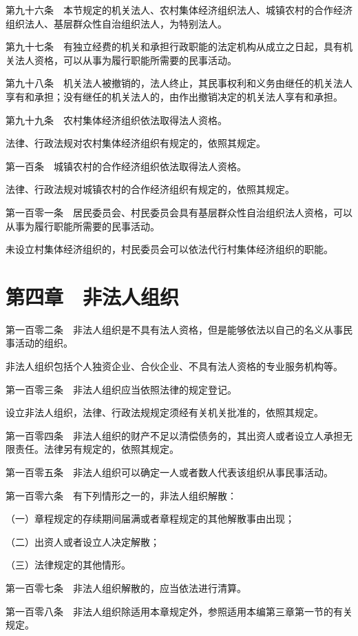 \documentclass[UTF8,12pt,a4paper]{ctexbook}
\begin{document}
第九十六条　本节规定的机关法人、农村集体经济组织法人、城镇农村的合作经济组织法人、基层群众性自治组织法人，为特别法人。

第九十七条　有独立经费的机关和承担行政职能的法定机构从成立之日起，具有机关法人资格，可以从事为履行职能所需要的民事活动。

第九十八条　机关法人被撤销的，法人终止，其民事权利和义务由继任的机关法人享有和承担；没有继任的机关法人的，由作出撤销决定的机关法人享有和承担。

第九十九条　农村集体经济组织依法取得法人资格。

法律、行政法规对农村集体经济组织有规定的，依照其规定。

第一百条　城镇农村的合作经济组织依法取得法人资格。

法律、行政法规对城镇农村的合作经济组织有规定的，依照其规定。

第一百零一条　居民委员会、村民委员会具有基层群众性自治组织法人资格，可以从事为履行职能所需要的民事活动。

未设立村集体经济组织的，村民委员会可以依法代行村集体经济组织的职能。

\section*{第四章　非法人组织}

第一百零二条　非法人组织是不具有法人资格，但是能够依法以自己的名义从事民事活动的组织。

非法人组织包括个人独资企业、合伙企业、不具有法人资格的专业服务机构等。

第一百零三条　非法人组织应当依照法律的规定登记。

设立非法人组织，法律、行政法规规定须经有关机关批准的，依照其规定。

第一百零四条　非法人组织的财产不足以清偿债务的，其出资人或者设立人承担无限责任。法律另有规定的，依照其规定。

第一百零五条　非法人组织可以确定一人或者数人代表该组织从事民事活动。

第一百零六条　有下列情形之一的，非法人组织解散：

（一）章程规定的存续期间届满或者章程规定的其他解散事由出现；

（二）出资人或者设立人决定解散；

（三）法律规定的其他情形。

第一百零七条　非法人组织解散的，应当依法进行清算。

第一百零八条　非法人组织除适用本章规定外，参照适用本编第三章第一节的有关规定。
\end{document}
